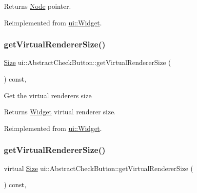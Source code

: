 \begin{DoxyReturn}{Returns}
\hyperlink{classNode}{Node} pointer. 
\end{DoxyReturn}


Reimplemented from \hyperlink{classui_1_1Widget_acf862bf9235fbb3823819eeb65d46f25}{ui\+::\+Widget}.

\mbox{\label{classui_1_1AbstractCheckButton_a0ad1948a65d977a254aaf06ca584ad8b}} 
\subsubsection{\texorpdfstring{get\+Virtual\+Renderer\+Size()}{getVirtualRendererSize()}\hspace{0.1cm}{\footnotesize\ttfamily [1/2]}}
{\footnotesize\ttfamily \hyperlink{classSize}{Size} ui\+::\+Abstract\+Check\+Button\+::get\+Virtual\+Renderer\+Size (\begin{DoxyParamCaption}{ }\end{DoxyParamCaption}) const\hspace{0.3cm}{\ttfamily [override]}, {\ttfamily [virtual]}}

Get the virtual renderer\textquotesingle{}s size \begin{DoxyReturn}{Returns}
\hyperlink{classui_1_1Widget}{Widget} virtual renderer size. 
\end{DoxyReturn}


Reimplemented from \hyperlink{classui_1_1Widget_a2ed0d41565593f78dc59c975d58a869e}{ui\+::\+Widget}.

\mbox{\label{classui_1_1AbstractCheckButton_a0c3cf028ae6915ee7eb59e287984b0ae}} 
\subsubsection{\texorpdfstring{get\+Virtual\+Renderer\+Size()}{getVirtualRendererSize()}\hspace{0.1cm}{\footnotesize\ttfamily [2/2]}}
{\footnotesize\ttfamily virtual \hyperlink{classSize}{Size} ui\+::\+Abstract\+Check\+Button\+::get\+Virtual\+Renderer\+Size (\begin{DoxyParamCaption}{ }\end{DoxyParamCaption}) const\hspace{0.3cm}{\ttfamily [override]}, {\ttfamily [virtual]}}

